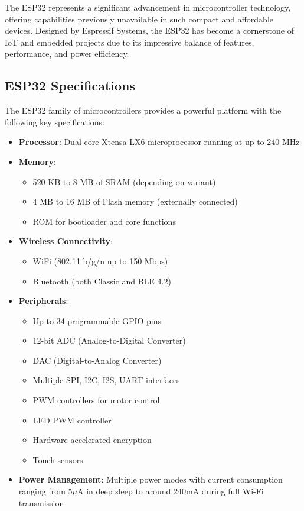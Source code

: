 \documentclass[12pt,a4paper]{report}
\begin{document}
The ESP32 represents a significant advancement in microcontroller technology, offering capabilities previously unavailable in such compact and affordable devices. Designed by Espressif Systems, the ESP32 has become a cornerstone of IoT and embedded projects due to its impressive balance of features, performance, and power efficiency.

\subsection{ESP32 Specifications}
The ESP32 family of microcontrollers provides a powerful platform with the following key specifications:

\begin{itemize}
    \item \textbf{Processor}: Dual-core Xtensa LX6 microprocessor running at up to 240 MHz
    \item \textbf{Memory}: 
        \begin{itemize}
            \item 520 KB to 8 MB of SRAM (depending on variant)
            \item 4 MB to 16 MB of Flash memory (externally connected)
            \item ROM for bootloader and core functions
        \end{itemize}
    \item \textbf{Wireless Connectivity}:
        \begin{itemize}
            \item WiFi (802.11 b/g/n up to 150 Mbps)
            \item Bluetooth (both Classic and BLE 4.2)
        \end{itemize}
    \item \textbf{Peripherals}:
        \begin{itemize}
            \item Up to 34 programmable GPIO pins
            \item 12-bit ADC (Analog-to-Digital Converter)
            \item DAC (Digital-to-Analog Converter)
            \item Multiple SPI, I2C, I2S, UART interfaces
            \item PWM controllers for motor control
            \item LED PWM controller
            \item Hardware accelerated encryption
            \item Touch sensors
        \end{itemize}
    \item \textbf{Power Management}: Multiple power modes with current consumption ranging from 5$\mu$A in deep sleep to around 240mA during full Wi-Fi transmission
\end{itemize}
\end{document}
